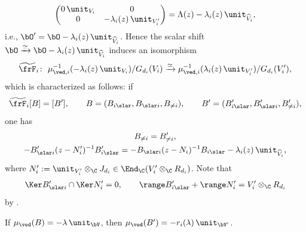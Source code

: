 \[
\begin{pmatrix} 0\,\unit_{V_i} & 0 \\
0 & -\lambda_i(z)\,\unit_{V'_i} \end{pmatrix}
=\Lambda(z)-\lambda_i(z)\,\unit_{\widehat{V}_i},
\]
i.e., $\bO' = \bO - \lambda_i(z)\,\unit_{\widehat{V}_i}$.
Hence the scalar shift
$\bO \xrightarrow{\simeq} \bO - \lambda_i(z)\,\unit_{\widehat{V}_i}$
induces an isomorphism
\[
\widetilde{\frF}_i \colon \
\mu_{\ved,i}^{-1}(-\lambda_i(z)\,\unit_{V_i})/G_{d_i}(V_i) \xrightarrow{\simeq}
\mu_{\ved,i}^{-1}(\lambda_i(z)\,\unit_{V'_i})/G_{d_i}(V'_i),
\]
which is characterized as follows: if
\[
\widetilde{\frF}_i[B]=[B'], \qquad
B=(B_{i \slar},B_{\slar i},B_{\neq i}),\qquad
B' =(B'_{i \slar},B'_{\slar i},B_{\neq i}'),
\]
one has
\begin{gather}
B_{\neq i}  = B_{\neq i}', \label{eq:refrelother}\\
- B'_{\slar i}(z-N'_i)^{-1}B'_{i \slar}
 =- B_{\slar i}(z-N_i)^{-1}B_{i \slar} - \lambda_i(z)\,\unit_{\widehat{V}_i},
\label{eq:shift}
\end{gather}
where $N'_i := \unit_{V'_i} \otimes_\C J_{d_i}
\in \End_\C(V'_i \otimes_\C R_{d_i})$.
Note that
\begin{gather}\label{eq:refstability}
\Ker B'_{\slar i} \cap \Ker N'_i =0, \qquad
\range B'_{i \slar} + \range N'_i = V'_i \otimes_\C R_{d_i}
\end{gather}
by .

\begin{Lemma}\label{lem:refmoment}
If $\mu_\ved(B)=-\lambda\,\unit_\bV$,
then $\mu_{\ved}(B')=-r_i(\lambda)\,\unit_{\bV'}$.
\end{Lemma}

